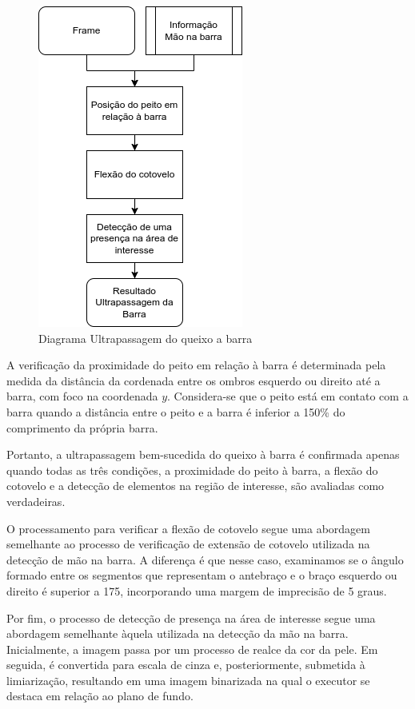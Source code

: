 \begin{figure}[!htb]
	\centering
	\includegraphics[scale=0.75]{figuras/diagrama/ultrapassagem_barra.png}
	\caption{Diagrama Ultrapassagem do queixo a barra }
	\label{dia:ultrapassagem}
\end{figure}
\newpage

A verificação da proximidade do peito em relação à barra é determinada pela medida da distância da cordenada entre os ombros esquerdo ou direito até a barra, com foco na coordenada $y$. Considera-se que o peito está em contato com a barra quando a distância entre o peito e a barra é inferior a 150\% do comprimento da própria barra.


Portanto, a ultrapassagem bem-sucedida do queixo à barra é confirmada apenas quando todas as três condições, a proximidade do peito à barra, a flexão do cotovelo e a detecção de elementos na região de interesse, são avaliadas como verdadeiras.

O processamento para verificar a flexão de cotovelo segue uma abordagem semelhante ao processo de verificação de extensão de cotovelo utilizada na detecção de mão na barra. A diferença é que nesse caso, examinamos se o ângulo formado entre os segmentos que representam o antebraço e o braço esquerdo ou direito é superior a 175, incorporando uma margem de imprecisão de 5 graus.

Por fim, o processo de detecção de presença na área de interesse segue uma abordagem semelhante àquela utilizada na detecção da mão na barra. Inicialmente, a imagem passa por um processo de realce da cor da pele. Em seguida, é convertida para escala de cinza e, posteriormente, submetida à limiarização, resultando em uma imagem binarizada na qual o executor se destaca em relação ao plano de fundo.

